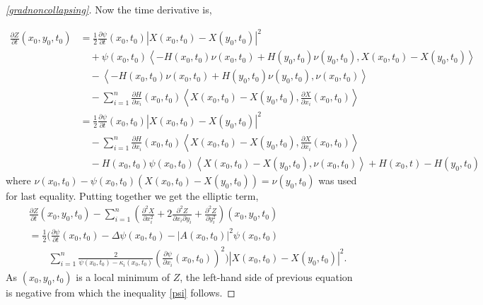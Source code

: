\begin{proof}[\cref{gradnoncollapsing}]
    Now the time derivative is,
    
    \begin{align*}
        \frac{\partial Z}{\partial t}(x_{0},y_{0},t_{0}) & = \frac{1}{2} \frac{\partial \psi}{\partial t}(x_{0},t_{0})|X(x_{0},t_{0})-X(y_{0},t_{0})|^{2} \\
        & \quad + \psi(x_{0},t_{0}) \left< -H(x_{0},t_{0})\nu(x_{0},t_{0})+H(y_{0},t_{0})\nu(y_{0},t_{0}), X(x_{0},t_{0})-X(y_{0},t_{0}) \right>  \\
        &\quad - \left< -H(x_{0},t_{0})\nu(x_{0},t_{0})+H(y_{0},t_{0})\nu(y_{0},t_{0}), \nu (x_{0},t_{0}) \right> \\
        & \quad - \sum_{i=1}^{n} \frac{\partial H}{\partial x_{i}}(x_{0},t_{0}) \left< X(x_{0},t_{0})-X(y_{0},t_{0}), \frac{\partial X}{\partial x_{i}}(x_{0},t_{0}) \right> \\
        & = \frac{1}{2} \frac{\partial \psi}{\partial t}(x_{0},t_{0})|X(x_{0},t_{0})-X(y_{0},t_{0})|^{2} \\
        & \quad - \sum_{i=1}^{n} \frac{\partial H}{\partial x_{i}}(x_{0},t_{0})\left< X(x_{0},t_{0})-X(y_{0},t_{0}), \frac{\partial X}{\partial x_{i}}(x_{0},t_{0}) \right> \\ 
        & \quad -H(x_{0},t_{0})\psi(x_{0},t_{0})\left< X(x_{0},t_{0})-X(y_{0},t_{0}), \nu(x_{0},t_{0}) \right> + H(x_{0},t)-H(y_{0},t_{0})
    \end{align*}
    where $ \nu(x_{0},t_{0}) - \psi(x_{0},t_{0})(X(x_{0},t_{0})-X(y_{0},t_{0})) =\nu(y_{0},t_{0})  $ was used for last equality. Putting together we get the elliptic term, \begin{align*}
        & \frac{\partial Z}{\partial t}(x_{0},y_{0},t_{0}) - \sum_{i=1}^{n}\left( \frac{\partial^{2} X}{\partial x_{i}^{2}} + 2 \frac{\partial^{2}Z}{\partial x_{i}\partial y_{i}} + \frac{\partial^{2} Z}{\partial y_{i}^{2}} \right)(x_{0},y_{0},t_{0}) \\
        & = \frac{1}{2}\bigg( \frac{\partial \psi}{\partial t}(x_{0},t_{0}) - \Delta \psi(x_{0},t_{0}) - |A(x_{0},t_{0})|^{2} \psi(x_{0},t_{0}) \\
        & \qquad \sum_{i=1}^{n} \frac{2}{\psi(x_{0},t_{0})-\kappa_{i}(x_{0},t_{0})}\left( \frac{\partial \psi}{\partial x_{i}}(x_{0},t_{0}) \right)^{2} \bigg)|X(x_{0},t_{0})-X(y_{0},t_{0})|^{2}.
    \end{align*}
    As $ (x_{0},y_{0},t_{0}) $ is a local minimum of $ Z $, the left-hand side of previous equation is negative from which the inequality \cref{psi} follows. 
    

\end{proof}
